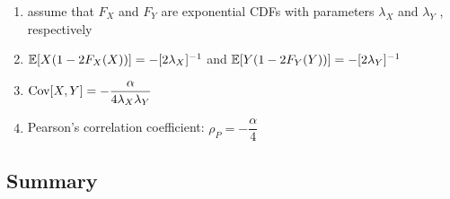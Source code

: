 \begin{enumerate}
    \item assume that $F_X$ and $F_Y$ are exponential CDFs with parameters $\lambda_X$ and $\lambda_Y$ , respectively
    \hfill \cite{statistics/book/Statistics-for-Data-Scientists/Maurits-Kaptein}

    \item $\mathbb{E}[X (1 - 2F_X (X))] = -[2\lambda_X ]^{-1}$ and $\mathbb{E}[Y (1 - 2F_Y (Y ))] = -[2\lambda_Y ]^{-1}$
    \hfill \cite{statistics/book/Statistics-for-Data-Scientists/Maurits-Kaptein}

    \item $\text{Cov}[X, Y] = -\dfrac{\alpha}{4\lambda_X \lambda_Y} $
    \hfill \cite{statistics/book/Statistics-for-Data-Scientists/Maurits-Kaptein}

    \item Pearson’s correlation coefficient: $\rho_P = -\dfrac{\alpha}{4}$ 
    \hfill \cite{statistics/book/Statistics-for-Data-Scientists/Maurits-Kaptein}
\end{enumerate}


\subsection{Summary}

